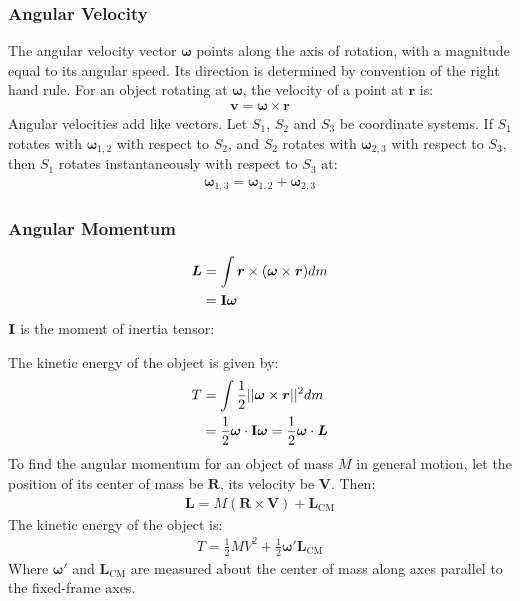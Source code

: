 \documentclass[11pt, letterpaper]{article}
\newcommand{\ve}[1]{
  \ensuremath{\bm{#1}}}	               %
\newcommand{\tensor}[1]{
  \ensuremath{\text{\bf{#1}}}}         %
\begin{document}
\begin{multicols*}{3}
\subsubsection{Angular Velocity}
The angular velocity vector $\ve{\omega}$ points along the axis of rotation, with a  magnitude equal to its angular speed. Its direction is determined by convention of the right hand rule. For an object rotating at $\ve{\omega}$, the velocity of a point at $\ve{r}$ is:
\begin{align*}
  \ve{v} = \ve{\omega} \times \ve{r}
\end{align*}
Angular velocities add like vectors. Let $S_1$, $S_2$ and $S_3$ be coordinate systems. If $S_1$ rotates with $\ve{\omega}_{1, 2}$ with respect to $S_2$, and $S_2$ rotates with $\ve{\omega}_{2, 3}$ with respect to $S_3$, then $S_1$ rotates instantaneously with respect to $S_3$ at: 
\begin{align*}
  \ve{\omega}_{1, 3} = \ve{\omega}_{1, 2} + \ve{\omega}_{2, 3}
\end{align*}

\subsubsection{Angular Momentum}
\begin{align*}
  \ve{L} &= \int \ve{r} \times (\ve{\omega} \times \ve{r}) dm \\
  &= \tensor{I} \ve{\omega}
\end{align*}
$\tensor{I}$ is the moment of inertia tensor:
\vspace*{-0.7em}
\begin{center}
\end{center}
The kinetic energy of the object is given by:
\begin{align*}
  T &= \int\frac{1}{2} ||\ve{\omega} \times \ve{r}||^2 dm \\
  &= \frac{1}{2} \ve{\omega} \cdot \tensor{I}\ve{\omega} = \frac{1}{2} \ve{\omega} \cdot \ve{L}
\end{align*}
To find the angular momentum for an object of mass $M$ in general motion, let the position of its center of mass be $\ve{R}$, its velocity be $\ve{V}$. Then:
\begin{align*}
  \ve{L} = M(\ve{R} \times \ve{V}) + \ve{L}_{\text{CM}}
\end{align*}
The kinetic energy of the object is:
\begin{align*}
  T = \frac{1}{2}MV^2 + \frac{1}{2}\ve{\omega}' \ve{L}_{\text{CM}}
\end{align*}
Where $\ve{\omega}'$ and $\ve{L}_{\text{CM}}$ are measured about the center of mass along axes parallel to the fixed-frame axes.


\end{multicols*}
\end{document}
